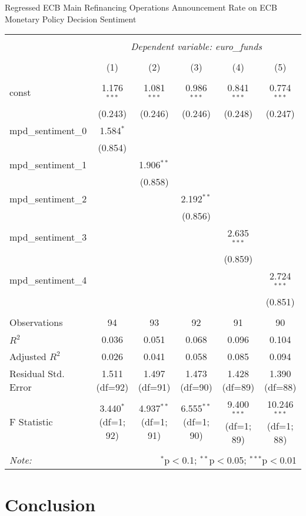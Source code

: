 \documentclass{article}
\begin{document}
 Regressed ECB Main Refinancing Operations Announcement Rate on ECB Monetary Policy Decision Sentiment

\begin{table}[H] 
\begin{adjustbox}{width=\textwidth}
\centering
\begin{tabular}{@{\extracolsep{5pt}}lccccc}
\\[-1.8ex]\hline
\hline \\[-1.8ex]
& \multicolumn{5}{c}{\textit{Dependent variable: euro\_funds}} \\
\cline{2-6}
\\[-1.8ex] & (1) & (2) & (3) & (4) & (5) \\
\hline \\[-1.8ex]
const & 1.176$^{***}$ & 1.081$^{***}$ & 0.986$^{***}$ & 0.841$^{***}$ & 0.774$^{***}$ \\
& (0.243) & (0.246) & (0.246) & (0.248) & (0.247) \\
mpd\_sentiment\_0 & 1.584$^{*}$ & & & & \\
& (0.854) & & & & \\
mpd\_sentiment\_1 & & 1.906$^{**}$ & & & \\
& & (0.858) & & & \\
mpd\_sentiment\_2 & & & 2.192$^{**}$ & & \\
& & & (0.856) & & \\
mpd\_sentiment\_3 & & & & 2.635$^{***}$ & \\
& & & & (0.859) & \\
mpd\_sentiment\_4 & & & & & 2.724$^{***}$ \\
& & & & & (0.851) \\
\hline \\[-1.8ex]
Observations & 94 & 93 & 92 & 91 & 90 \\
$R^2$ & 0.036 & 0.051 & 0.068 & 0.096 & 0.104 \\
Adjusted $R^2$ & 0.026 & 0.041 & 0.058 & 0.085 & 0.094 \\
Residual Std. Error & 1.511 (df=92) & 1.497 (df=91) & 1.473 (df=90) & 1.428 (df=89) & 1.390 (df=88) \\
F Statistic & 3.440$^{*}$ (df=1; 92) & 4.937$^{**}$ (df=1; 91) & 6.555$^{**}$ (df=1; 90) & 9.400$^{***}$ (df=1; 89) & 10.246$^{***}$ (df=1; 88) \\
\hline
\hline \\[-1.8ex]
\textit{Note:} & \multicolumn{5}{r}{$^{*}$p$<$0.1; $^{**}$p$<$0.05; $^{***}$p$<$0.01} \\
\end{tabular}
\end{adjustbox}
\end{table}


\section{Conclusion}
\end{document}
